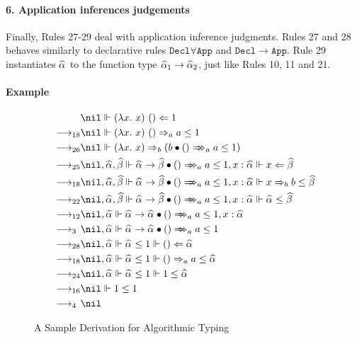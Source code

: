 
\paragraph{\bf 6. Application inferences judgements}
Finally, Rules 27-29 deal with application inference judgments.
Rules 27 and 28 behaves similarly to declarative rules $\mathtt{Decl\forall App}$ and $\mathtt{Decl\to App}$.
Rule 29 instantiates $\al$ to the function type $\al[1] \to \al[2]$, just like Rules 10, 11 and 21.




\paragraph{Example}

\begin{figure}
\begin{gather*}
\begin{aligned}
           & \nil \Vdash (\lam x)~() \Lto 1\\
\rrule{18} & \nil \Vdash (\lam x)~() \To_a a\le 1\\
\rrule{26} & \nil \Vdash (\lam x) \To_b (\appInfAlg{b}{()}[a][a\le 1])\\
\rrule{25} & \nil,\al,\bt \Vdash \appInfAlg{\al\to\bt}{()}[a][a\le 1], x:\al \Vdash x\Lto \bt\\
\rrule{18} & \nil,\al,\bt \Vdash \appInfAlg{\al\to\bt}{()}[a][a\le 1], x:\al \Vdash x\To_b b\le \bt\\
\rrule{22} & \nil,\al,\bt \Vdash \appInfAlg{\al\to\bt}{()}[a][a\le 1], x:\al \Vdash \al\le \bt\\
\rrule{12} & \nil,\al \Vdash \appInfAlg{\al\to\al}{()}[a][a\le 1], x:\al\\
\rrule{3}  & \nil,\al \Vdash \appInfAlg{\al\to\al}{()}[a][a\le 1]\\
\rrule{28} & \nil,\al \Vdash \al\le 1 \Vdash () \Lto \al\\
\rrule{18} & \nil,\al \Vdash \al\le 1 \Vdash () \To_a a\le \al\\
\rrule{24} & \nil,\al \Vdash \al\le 1 \Vdash 1\le \al\\
\rrule{16} & \nil \Vdash 1\le 1\\
\rrule{4}  & \nil
\end{aligned}
\end{gather*}
\caption{A Sample Derivation for Algorithmic Typing}
\label{fig:alg:sample}
\end{figure}

